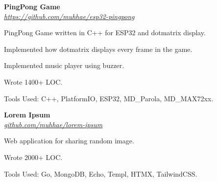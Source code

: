     \begin{twocolentry}{
    }
    \textbf{PingPong Game}\\
    \textit{\href{https://github.com/muhhae/esp32-pingpong}{https://github.com/muhhae/esp32-pingpong}}
    \end{twocolentry}

    \vspace{0.10 cm}
    \begin{onecolentry}
        \begin{highlights}
            \item PingPong Game written in C++ for ESP32 and dotmatrix display.
            \item Implemented how dotmatrix displays every frame in the game.
            \item Implemented music player using buzzer.
            \item Wrote 1400+ LOC.
            \item Tools Used: C++, PlatformIO, ESP32, MD\_Parola, MD\_MAX72xx.
        \end{highlights}
    \end{onecolentry}

    \vspace{0.2 cm}

    \begin{twocolentry}{
    }
    \textbf{Lorem Ipsum}\\
    \textit{\href{https://github.com/muhhae/lorem-ipsum}{github.com/muhhae/lorem-ipsum}}
    \end{twocolentry}

    \vspace{0.10 cm}
    \begin{onecolentry}
        \begin{highlights}
            \item Web application for sharing random image.
            \item Wrote 2000+ LOC.
            \item Tools Used: Go, MongoDB, Echo, Templ, HTMX, TailwindCSS.
        \end{highlights}
    \end{onecolentry}
